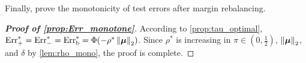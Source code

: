 Finally, prove the monotonicity of test errors after margin rebalancing.

\begin{proof}[\textbf{Proof of \cref{prop:Err_monotone}}]
    According to \cref{prop:tau_optimal}, $\mathrm{Err}_+^* = \mathrm{Err}_-^* = \mathrm{Err}_\mathrm{b}^* = \Phi(- \rho^* \left\|{\text{\boldmath $\mu$}}\right\|_2 )$. Since $\rho^*$ is increasing in $\pi \in (0, \frac12)$, $\left\|{\text{\boldmath $\mu$}}\right\|_2$, and $\delta$ by \cref{lem:rho_mono}, the proof is complete.
\end{proof}




